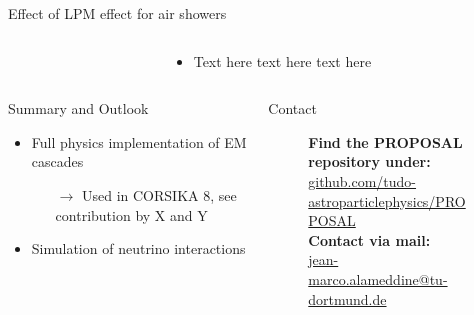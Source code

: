 \documentclass[t]{beamer}
\begin{document}
\begin{columns}[onlytextwidth]
\begin{column}{0.6\textwidth}
\begin{block}[equal height group=PLOTS]{Effect of LPM effect for air showers}
\begin{columns}[onlytextwidth]
\begin{column}{0.65\textwidth}
            \end{column}
            \begin{column}{0.35\textwidth}%
              \begin{itemize}[leftmargin=1.5cm]
                \item Text here text here text here
              \end{itemize}
            \end{column}            
        \end{columns}
      \end{block}
    \end{column}
    \end{columns}




  \begin{columns}[onlytextwidth]%
    \begin{column}{0.4\textwidth}%
      \begin{block}[equal height group=Z]{Summary and Outlook}%
        \begin{itemize}
          \item Full physics implementation of EM cascades
          \begin{itemize}
            \item[$\rightarrow$] Used in CORSIKA 8, see contribution by X and Y
          \end{itemize}
          \item Simulation of neutrino interactions
        \end{itemize}
      \end{block}
    \end{column}
    \begin{column}{0.4\textwidth}%
      \begin{block}[equal height group=Z]{Contact}%
        \begin{center}
          \begin{figure}[ht]
            \begin{minipage}[ht]{0.75\linewidth}
              \textbf{Find the PROPOSAL repository under:}\\ \url{github.com/tudo-astroparticlephysics/PROPOSAL} \vspace{0.5em}\\
              \textbf{Contact via mail:}\\ \href{mailto:me@jean-marco.alameddine@tu-dortmund.de}{jean-marco.alameddine@tu-dortmund.de} 
            \end{minipage}

\end{figure}
\end{center}
\end{block}
\end{column}
\end{columns}
\end{document}
